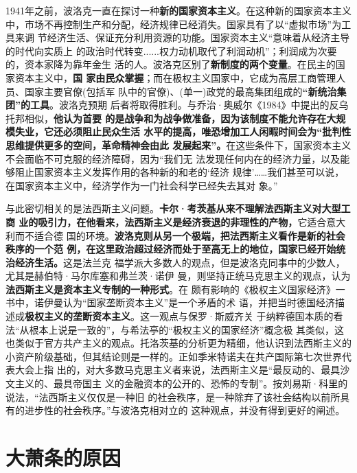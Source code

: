 1941年之前，波洛克一直在探讨一种\textbf{新的国家资本主义}。在这种新的国家资本主义
中，市场不再控制生产和分配，经济规律已经消失。国家具有了以“虚拟市场”为工具来调
节经济生活、保证充分利用资源的功能。国家资本主义“意味着从经济主导的时代向实质上
的政治时代转变......权力动机取代了利润动机”；利润成为次要的，资本家降为靠年金生
活的人。波洛克区别了\textbf{新制度的两个变量}。在民主的国家资本主义中，\textbf{国
  家由民众掌握}；而在极权主义国家中，它成为高层工商管理人员、国家主要官僚(包括军
队中的官僚)、(单一)政党的最高集团组成的\textbf{“新统治集团”的工具}。波洛克预期
后者将取得胜利。与乔治·奥威尔《1984》中提出的反乌托邦相似，\textbf{他认为首要
  的是战争和为战争做准备，因为该制度不能允许存在大规模失业，它还必须阻止民众生活
  水平的提高，唯恐增加工人闲暇时间会为“批判性思维提供更多的空间，革命精神会由此
  发展起来”。}在这些条件下，国家资本主义不会面临不可克服的经济障碍，因为“我们无
法发现任何内在的经济力量，以及能够阻止国家资本主义发挥作用的各种新的和老的‘经济
规律’……我们甚至可以说，在国家资本主义中，经济学作为一门社会科学已经失去其对
象。”

与此密切相关的是法西斯主义问题。\textbf{卡尔·考茨基从来不理解法西斯主义对大型工商
业的吸引力，在他看来，法西斯主义是经济衰退的非理性的产物，}它适合意大利而不适合德
国的环境。\textbf{波洛克则从另一个极端，把法西斯主义看作是新的社会秩序的一个范
例，在这里政治超过经济而处于至高无上的地位，国家已经开始统治经济生活。}这是法兰克
福学派大多数人的观点，但是波洛克同事中的少数人，尤其是赫伯特·马尔库塞和弗兰茨·诺伊
曼，则坚持正统马克思主义的观点，认为\textbf{法西斯主义是资本主义专制的一种形式}。在
颇有影响的《极权主义国家经济》一书中，诺伊曼认为“国家垄断资本主义”是一个矛盾的术
语，并把当时德国经济描述成\textbf{极权主义的垄断资本主义}。这一观点与保罗·斯威齐关
于纳粹德国本质的看法“从根本上说是一致的”，与希法亭的“极权主义的国家经济”概念极
其类似，这也类似于官方共产主义的观点。托洛茨基的分析更为精细，他认识到法西斯主义的
小资产阶级基础，但其结论则是一样的。正如季米特诺夫在共产国际第七次世界代表大会上指
出的，对大多数马克思主义者来说，法西斯主义是“最反动的、最具沙文主义的、最具帝国主
义的金融资本的公开的、恐怖的专制”。按刘易斯·科里的说法，“法西斯主义仅仅是一种旧
的社会秩序，是一种除弃了该社会结构以前所具有的进步性的社会秩序。”与波洛克相对立的
这种观点，并没有得到更好的阐述。

\section{大萧条的原因}

